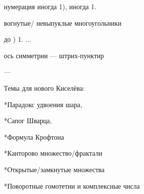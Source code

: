 

















нумерация иногда 1), иногда 1.




вогнутые/ невыпуклые многоугольники 

\smallskip до ) 1. ...


ось симметрии --- штрих-пунктир










---

Темы для нового Киселёва:

*Парадокс удвоения шара,

*Сапог Шварца,

*Формула Крофтона

*Канторово множество/фрактали

*Открытые/замкнутые множества

*Поворотные гомотетии и комплексные числа
